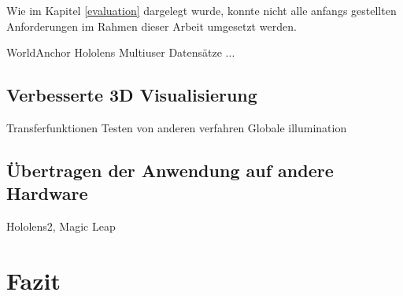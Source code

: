 Wie im Kapitel \ref{evaluation} dargelegt wurde, konnte nicht alle anfangs gestellten Anforderungen im Rahmen dieser Arbeit umgesetzt werden. 

WorldAnchor Hololens
Multiuser
Datensätze
...

\subsection{Verbesserte 3D Visualisierung}
Transferfunktionen
Testen von anderen verfahren
Globale illumination

\subsection{Übertragen der Anwendung auf andere Hardware}
Hololens2, Magic Leap

\section{Fazit}
